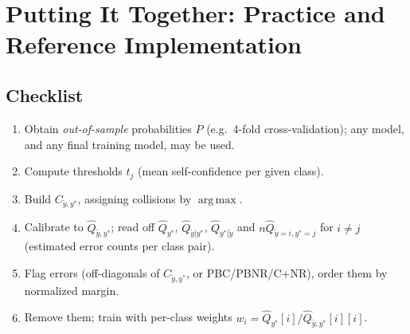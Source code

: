 \documentclass[11pt,a4paper]{report}
\newcommand{\Cyy}{C_{\tilde y,y^*}}
\newcommand{\argmax}{\operatorname*{arg\,max}}
\newcommand{\1}{\mathbf 1}
\theoremstyle{definition}
\theoremstyle{plain}
\theoremstyle{remark}
\begin{document}
\chapter{Putting It Together: Practice and Reference Implementation}

\section{Checklist}
\begin{enumerate}
  \item Obtain \emph{out-of-sample} probabilities $\hat P$ (e.g.\ 4-fold cross-validation); any model, and any final training model, may be used.
  \item Compute thresholds $t_j$ (mean self-confidence per given class).
  \item Build $\Cyy$, assigning collisions by $\argmax$.
  \item Calibrate to $\hat Q_{\tilde y,y^*}$; read off $\hat Q_{y^*}$, $\hat Q_{\tilde y|y^*}$, $\hat Q_{y^*|\tilde y}$ and $n\hat Q_{\tilde y=i,y^*=j}$ for $i\ne j$ (estimated error counts per class pair).
  \item Flag errors (off-diagonals of $\Cyy$, or PBC/PBNR/C+NR), order them by normalized margin.
  \item Remove them; train with per-class weights $w_i=\hat Q_{y^*}[i]/\hat Q_{\tilde y,y^*}[i][i]$.
\end{enumerate}
\end{document}
